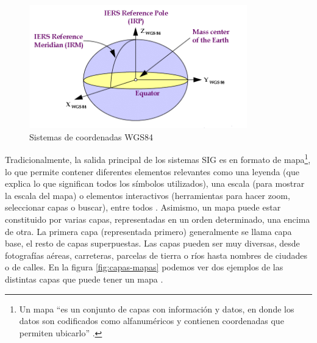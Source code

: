 \begin{figure}[H]
	\centering
	\includegraphics[height=5.35cm]{imagenes/capitulo2/Figure-36-World-Geodetic-System-1984-WGS84}
	\caption{Sistemas de coordenadas WGS84 \cite{WGS84}}
	\label{fig:WGS84}
\end{figure}

Tradicionalmente, la salida principal de los sistemas SIG es en formato de mapa\footnote{Un mapa ``es un conjunto de capas con información y datos, en donde los datos son codificados como alfanuméricos y contienen coordenadas que permiten ubicarlo'' \cite{congreso-ritsi}.}, lo que permite contener diferentes elementos relevantes como una leyenda (que explica lo que significan todos los símbolos utilizados), una escala (para mostrar la escala del mapa) o elementos interactivos (herramientas para hacer zoom, seleccionar capas o buscar), entre todos \cite{tesis}. Asimismo, un mapa puede estar constituido por varias capas, representadas en un orden determinado, una encima de otra. La primera capa (representada primero) generalmente se llama capa base, el resto de capas superpuestas. Las capas pueden ser muy diversas, desde fotografías aéreas, carreteras, parcelas de tierra o ríos hasta nombres de ciudades o de calles. En la figura \ref{fig:capas-mapas} podemos ver dos ejemplos de las distintas capas que puede tener un mapa \cite{VictorOlaya}.

